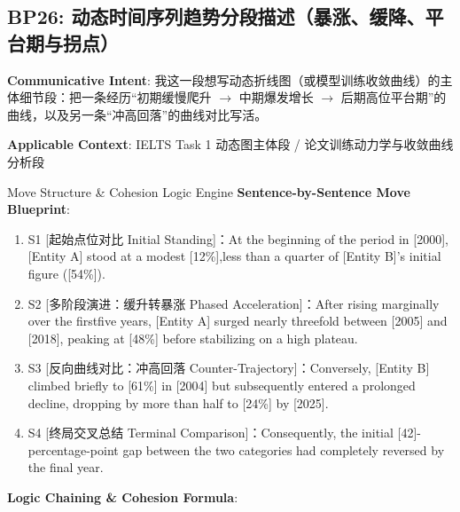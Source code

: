 \subsection{BP26: 动态时间序列趋势分段描述（暴涨、缓降、平台期与拐点）}\label{sec:bp:BP26}
\noindent\textbf{\color{AcadNavy}Communicative Intent}: 我这一段想写动态折线图（或模型训练收敛曲线）的主体细节段：把一条经历“初期缓慢爬升 $\to$ 中期爆发增长 $\to$ 后期高位平台期”的曲线，以及另一条“冲高回落”的曲线对比写活。\par\vspace{2pt}
\noindent\textbf{\color{AcadSlate}Applicable Context}: IELTS Task 1 动态图主体段 / 论文训练动力学与收敛曲线分析段\par\vspace{4pt}
\begin{ConceptBox}{Move Structure \& Cohesion Logic Engine}
\textbf{Sentence-by-Sentence Move Blueprint}:
\begin{enumerate}[label=\textbf{\color{AcadNavy}S\arabic*.}, leftmargin=2em, itemsep=2pt]
  \item S1 [起始点位对比 Initial Standing]：At the beginning of the period in [2000], [Entity A] stood at a modest [12\%],less than a quarter of [Entity B]'s initial figure ([54\%]).
  \item S2 [多阶段演进：缓升转暴涨 Phased Acceleration]：After rising marginally over the firstfive years, [Entity A] surged nearly threefold between [2005] and [2018], peaking at [48\%] before stabilizing on a high plateau.
  \item S3 [反向曲线对比：冲高回落 Counter-Trajectory]：Conversely, [Entity B] climbed briefly to [61\%] in [2004] but subsequently entered a prolonged decline, dropping by more than half to [24\%] by [2025].
  \item S4 [终局交叉总结 Terminal Comparison]：Consequently, the initial [42]-percentage-point gap between the two categories had completely reversed by the final year.
\end{enumerate}\par\vspace{4pt}
\textbf{Logic Chaining \& Cohesion Formula}:\par{}
\end{ConceptBox}
